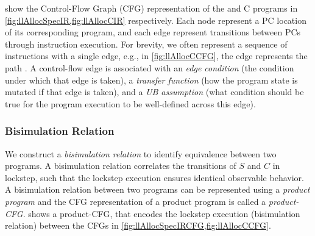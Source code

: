 

\vspace{-5px}
 show the Control-Flow Graph (CFG) representation
of the \SpecL{} and C programs in \cref{fig:llAllocSpecIR,fig:llAllocCIR} respectively.
Each node represent a PC location of its corresponding program, and each edge represent
transitions between PCs through instruction execution. For brevity, we often represent
a sequence of instructions with a single edge, e.g., in \cref{fig:llAllocCCFG}, the edge
 represents the path .
A control-flow edge is associated with an {\em edge condition} (the condition under which that edge is taken),
a {\em transfer function} (how the program state is mutated if that edge is taken),
and a {\em UB assumption} (what condition should be true for the program
execution to be well-defined across this edge).

\subsubsection{Bisimulation Relation}
\label{sec:syn-bisim}
We construct a {\em bisimulation relation} to identify equivalence between two programs.
A bisimulation relation correlates the transitions of $S$ and $C$ in lockstep, such that the
lockstep execution ensures identical observable behavior.
A bisimulation relation between two programs can be represented using a {\em product program}
\cite{covac} and the CFG representation of a product program is called a {\em product-CFG}.
 shows a product-CFG, that encodes the lockstep execution
(bisimulation relation) between the CFGs in \cref{fig:llAllocSpecIRCFG,fig:llAllocCCFG}.

